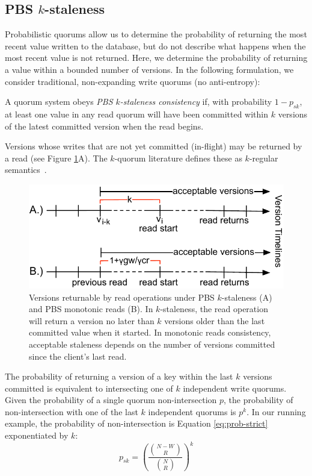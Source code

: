 \documentclass{vldb}
\newcommand{\subsectionskip}{-0em}
\begin{document}
\vspace{\subsectionskip}\subsection{PBS $k$-staleness}
\label{sec:kstale}

Probabilistic quorums allow us to determine the probability of
returning the most recent value written to the database, but do not
describe what happens when the most recent value is not returned.
Here, we determine the probability of returning a value within a
bounded number of versions.  In the following formulation, we consider
traditional, non-expanding write quorums (no anti-entropy):
\begin{definition}
A quorum system obeys \textit{PBS $k$-staleness consistency} if, with
probability $1-p_{sk}$, at least one value in any read quorum will
have been committed within $k$ versions of the latest committed
version when the read begins.
\end{definition}
Versions whose writes that are not yet committed (in-flight) may be
returned by a read (see Figure \ref{fig:timelines}A).  The $k$-quorum
literature defines these as $k$-regular semantics~\cite{non-strict}.

\begin{figure}
\centering
\includegraphics[width=.95\columnwidth]{figs/timelines.pdf}
\vspace{-8pt}
\caption{Versions returnable by read operations under PBS
  $k$-staleness (A) and PBS monotonic reads (B). In $k$-staleness, the
  read operation will return a version no later than $k$ versions
  older than the last committed value when it started.  In monotonic
  reads consistency, acceptable staleness depends on the number of
  versions committed since the client's last read.}
\vspace{-12pt}
\label{fig:timelines}
\end{figure}

The probability of returning a version of a key within the last $k$
versions committed is equivalent to intersecting one of $k$
independent write quorums.  Given the probability of a single quorum
non-intersection $p$, the probability of non-intersection with one of
the last $k$ independent quorums is $p^k$.  In our running example, the probability of non-intersection is Equation
\ref{eq:prob-strict} exponentiated by $k$:
\begin{equation}
\label{eq:k-consistency}
p_{sk} = \left(\frac{{N-W \choose R}}{{N \choose R}}\right)^k
\end{equation}
\end{document}
